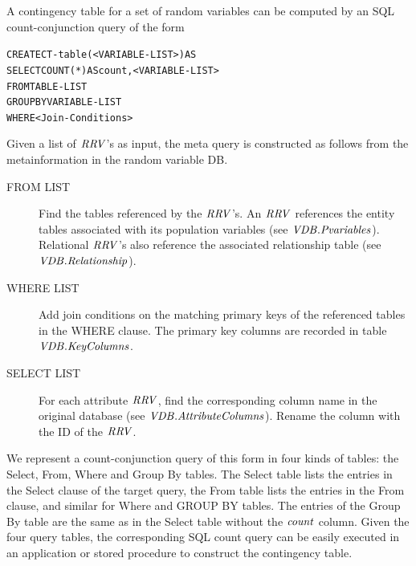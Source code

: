 \documentclass{acm_proc_article-sp}
\begin{document}
A contingency table for a set of random variables can be computed by an SQL count-conjunction query of the form 
\begin{alltt}
CREATE CT-table(<VARIABLE-LIST>) AS
SELECT COUNT(*) AS count, <VARIABLE-LIST>
FROM TABLE-LIST
GROUP BY VARIABLE-LIST
WHERE <Join-Conditions>
\end{alltt}

 Given a list of $\it{RRV}$'s as input, the meta query is constructed as follows from the metainformation in the random variable DB.  
\begin{description}
\item[FROM LIST] Find the tables referenced by the $\it{RRV}$'s. An $\it{RRV}$ references the entity tables associated with its population variables (see $\it{VDB}.Pvariables$). Relational $\it{RRV}$'s also reference the associated relationship table (see $\it{VDB}.Relationship$). 
\item[WHERE LIST] Add join conditions on the matching primary keys of the referenced tables in the WHERE clause. The primary key columns are recorded in table $\it{VDB}.KeyColumns$. 
\item[SELECT LIST] For each attribute $\it{RRV}$, find the corresponding column name in the original database (see $\it{VDB}.AttributeColumns$). Rename the column with the ID of the $\it{RRV}$.
\end{description}

We represent a count-conjunction query of this form in 
four kinds of tables: the Select, From, Where and Group By tables. The Select table lists the entries in the Select clause of the target query, the From table lists the entries in the From clause, and similar for Where and GROUP BY tables. The entries of the Group By table are the same as in the Select table without the $\it{count}$ column.
Given the four query tables, the corresponding SQL count query can be easily executed in an application or stored procedure to construct the contingency table.
\end{document}
